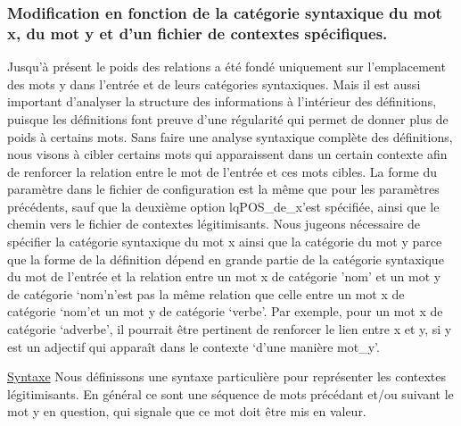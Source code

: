 \subsubsection{Modification en fonction de la catégorie syntaxique du mot x, du 
mot y et d'un fichier de contextes spécifiques.} 
Jusqu'à présent le poids des relations a été fondé uniquement sur l'emplacement 
des mots y dans l'entrée et de leurs catégories syntaxiques. Mais il est aussi 
important d'analyser la structure des informations à l'intérieur des 
définitions, puisque les définitions font preuve d'une régularité qui permet de 
donner plus de poids à certains mots. Sans faire une analyse syntaxique complète 
des définitions, nous visons à cibler certains mots qui apparaissent dans un 
certain contexte afin de renforcer la relation entre le mot de l'entrée et ces 
mots cibles. La forme du paramètre dans le fichier de configuration est la même 
que pour les paramètres précédents, sauf que la deuxième option 
lq{POS\_de\_x}\rq est spécifiée, ainsi que le chemin vers le fichier de 
contextes légitimisants.
\newline\newline
Nous jugeons nécessaire de spécifier la catégorie syntaxique du mot x ainsi que 
la catégorie du mot y parce que la forme de la définition dépend en grande 
partie de la catégorie syntaxique du mot de l'entrée et la relation entre un 
mot x de catégorie 'nom' et un mot y de catégorie \lq{nom}\rq n'est pas la même 
relation que celle entre un mot x de catégorie \lq{nom}\rq et un mot y de 
catégorie \lq{verbe}\rq.
\newline\newline
Par exemple, pour un mot x de catégorie \lq{adverbe}\rq, il pourrait être 
pertinent de renforcer le lien entre x et y, si y est un adjectif qui apparaît 
dans le contexte \lq{d'une manière mot\_y}\rq.

\underline{Syntaxe}\newline
Nous définissons une syntaxe particulière pour représenter les contextes 
légitimisants. En général ce sont une séquence de mots précédant et/ou suivant 
le mot y en question, qui signale que ce mot doit être mis en valeur.\newline

